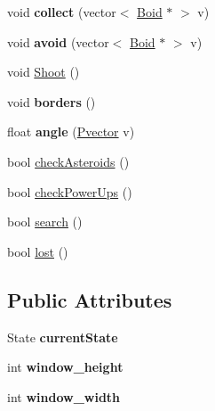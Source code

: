 \begin{DoxyCompactItemize}
\item 
void {\bfseries collect} (vector$<$ \hyperlink{class_boid}{Boid} $\ast$ $>$ v)\hypertarget{class_predator_aaf3ad972a24646832416236c86ab36aa}{}\label{class_predator_aaf3ad972a24646832416236c86ab36aa}

\item 
void {\bfseries avoid} (vector$<$ \hyperlink{class_boid}{Boid} $\ast$ $>$ v)\hypertarget{class_predator_aa6d6052914c3a871de7ebf1fd34d94f3}{}\label{class_predator_aa6d6052914c3a871de7ebf1fd34d94f3}

\item 
void \hyperlink{class_predator_aab6685aa7f3dade3240bfcee3048e858}{Shoot} ()
\item 
void {\bfseries borders} ()\hypertarget{class_predator_a81ff4b9425c0ffc0bfd0196cefd0bcae}{}\label{class_predator_a81ff4b9425c0ffc0bfd0196cefd0bcae}

\item 
float {\bfseries angle} (\hyperlink{class_pvector}{Pvector} v)\hypertarget{class_predator_a6773b9bc44f50915a04d103098dbaa12}{}\label{class_predator_a6773b9bc44f50915a04d103098dbaa12}

\item 
bool \hyperlink{class_predator_a0449f244349677659a5cd27080c9aca1}{check\+Asteroids} ()
\item 
bool \hyperlink{class_predator_a347766d9f7d0e61a2a12f68f666e53ca}{check\+Power\+Ups} ()
\item 
bool \hyperlink{class_predator_a745d27d50ed80880f6b46457317bb5e8}{search} ()
\item 
bool \hyperlink{class_predator_a54f146394015e6aa909aab06dd114dc6}{lost} ()
\end{DoxyCompactItemize}
\subsection*{Public Attributes}
\begin{DoxyCompactItemize}
\item 
State {\bfseries current\+State}\hypertarget{class_predator_ad3076bd4d85d226df66aaf734a5061ef}{}\label{class_predator_ad3076bd4d85d226df66aaf734a5061ef}

\item 
int {\bfseries window\+\_\+height}\hypertarget{class_predator_aa3e9d3174e5360cbf39fc888d4c4fa43}{}\label{class_predator_aa3e9d3174e5360cbf39fc888d4c4fa43}

\item 
int {\bfseries window\+\_\+width}\hypertarget{class_predator_a2c2fc58cedd05944e1b896e4d950cde5}{}\label{class_predator_a2c2fc58cedd05944e1b896e4d950cde5}

\end{DoxyCompactItemize}
